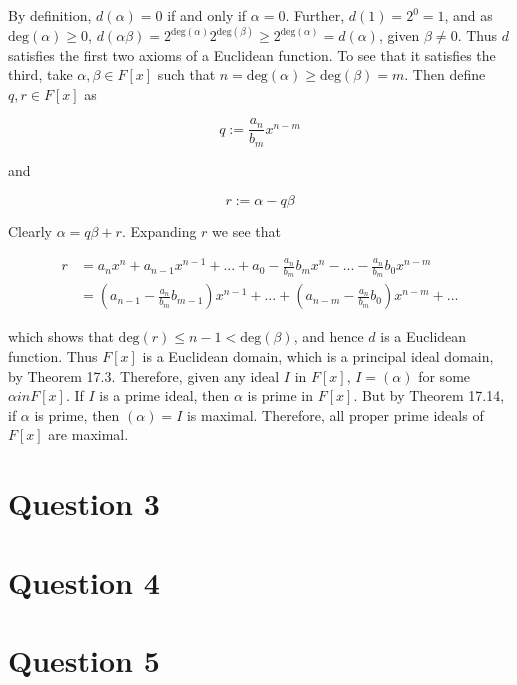 \documentclass{article}
\begin{document}
By definition, $d(\alpha) = 0$ if and only if $\alpha = 0$. Further,
$d(1) = 2^0 = 1$, and as $\text{deg}(\alpha) \geq 0$,
$d(\alpha\beta) = 2^{\text{deg}(\alpha)}2^{\text{deg}(\beta)}
    \geq 2^{\text{deg}(\alpha)} = d(\alpha)$, given $\beta \neq 0$. Thus
$d$ satisfies the first two axioms of a Euclidean function. To see that it
satisfies the third, take $\alpha, \beta \in F[x]$ such that
$n = \text{deg}(\alpha) \geq \text{deg}(\beta) = m$. Then define $q, r \in F[x]$ as

\begin{equation*}
    q := \frac{a_n}{b_m}x^{n - m}
\end{equation*}

and

\begin{equation*}
    r := \alpha - q\beta
\end{equation*}

Clearly $\alpha = q\beta + r$. Expanding $r$ we see that

\begin{align*}
    r &= a_nx^n + a_{n - 1}x^{n - 1} + ... + a_0 - \frac{a_n}{b_m}b_mx^{n}
        - ... - \frac{a_n}{b_m}b_0x^{n - m}\\
    &= \left(a_{n - 1} - \frac{a_n}{b_m}b_{m - 1}\right)x^{n - 1} + ...
        + \left(a_{n - m} - \frac{a_n}{b_m}b_0\right)x^{n - m} + ...
\end{align*}

which shows that $\text{deg}(r) \leq n - 1 < \text{deg}(\beta)$, and hence
$d$ is a Euclidean function. Thus $F[x]$ is a Euclidean domain, which is
a principal ideal domain, by Theorem 17.3. Therefore, given any ideal $I$
in $F[x]$, $I = (\alpha)$ for some $\alpha in F[x]$. If $I$ is a prime
ideal, then $\alpha$ is prime in $F[x]$. But by Theorem 17.14, if $\alpha$
is prime, then $(\alpha) = I$ is maximal. Therefore, all proper prime ideals
of $F[x]$ are maximal.

\section*{Question 3}
\section*{Question 4}
\section*{Question 5}
\end{document}
